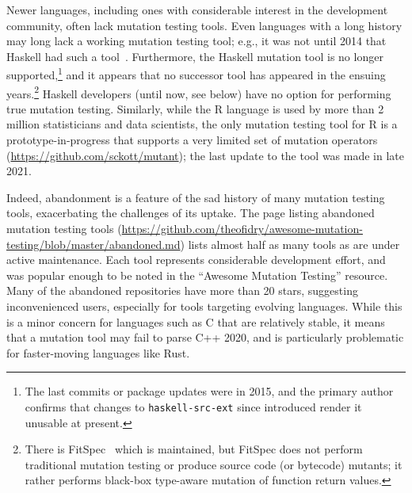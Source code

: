 \documentclass[acmsmall]{acmart}
\begin{document}
Newer languages, including ones with considerable interest
in the development community, often lack mutation testing tools.  Even
languages with a long history may long lack a working mutation testing
tool; e.g., it was not until 2014 that Haskell had such a tool~\cite{mucheck}. 
Furthermore, the Haskell mutation tool is no longer
supported,\footnote{The last commits or package updates were in 2015, and the
primary author confirms that changes to {\tt haskell-src-ext} since
introduced render it unusable at present.} and it
appears that no successor tool has appeared in the ensuing
years.\footnote{There is FitSpec~\cite{FitSpec} which is maintained,
  but FitSpec does not perform traditional mutation testing or produce
  source code (or bytecode) mutants; it rather
  performs black-box type-aware mutation of function return values.}
Haskell developers (until now, see below) have no option for
performing true mutation testing.   Similarly, while the R language is
used by more than 2 million statisticians and data scientists, the
only mutation testing tool for R is a prototype-in-progress that
supports a very limited set of mutation operators
(\url{https://github.com/sckott/mutant}); the last update to the tool
was made in late 2021.

Indeed, abandonment is a feature of the sad history
of many mutation testing tools, exacerbating the challenges of its uptake.  The page listing abandoned
mutation testing tools
(\url{https://github.com/theofidry/awesome-mutation-testing/blob/master/abandoned.md})
lists almost half as many tools as are under active maintenance. Each tool represents 
considerable development effort, and was
popular enough to be noted in the ``Awesome
Mutation Testing'' resource. Many of the abandoned repositories have more than
20 stars, suggesting inconvenienced users, especially for tools targeting
evolving languages. While this is a minor concern for languages such as C
that are relatively stable, it means that a mutation tool may fail
to parse C++ 2020, and is particularly problematic for 
faster-moving languages like Rust.
\end{document}
